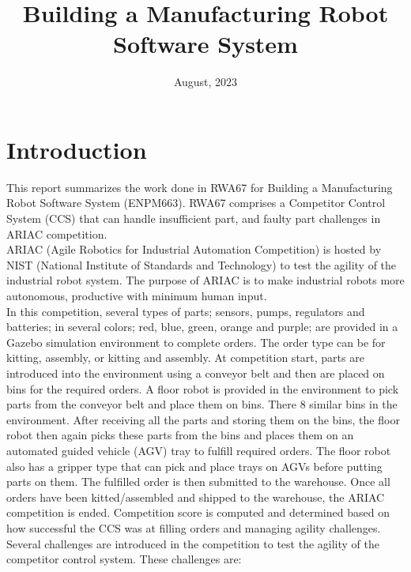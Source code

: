 \documentclass{uva-inf-article}
\title{Building a Manufacturing
Robot Software System}
\date{August, 2023}
\begin{document}
\maketitle 
\newpage
\tableofcontents
\newpage
\listoffigures
\newpage
\setlength{\hsize}{0.9\hsize}
\justifying
\section{Introduction}
This report summarizes the work done in RWA67 for Building a Manufacturing Robot Software
System (ENPM663). RWA67 comprises a Competitor Control System (CCS) that can handle insufficient part, and faulty part challenges in ARIAC competition.\\

\noindent ARIAC (Agile Robotics for Industrial Automation Competition) is hosted by NIST (National Institute of Standards and Technology) to test the agility of the industrial robot system. The purpose of ARIAC is to make industrial robots more autonomous, productive with minimum human input.\\

\noindent In this competition, several types of parts; sensors, pumps, regulators and batteries; in several colors; red, blue, green, orange and purple; are provided in a Gazebo simulation environment to complete orders. The order type can be for kitting, assembly, or kitting and assembly. At competition start, parts are introduced into the environment using a conveyor belt and then are placed on bins for the required orders. A floor robot is provided in the environment to pick parts from the conveyor belt and place them on bins. There 8 similar bins in the environment. After receiving all the parts and storing them on the bins, the floor robot then again picks these parts from the bins and places them on an automated guided vehicle (AGV) tray to fulfill required orders. The floor robot also has a gripper type that can pick and place trays on AGVs before putting parts on them. The fulfilled order is then submitted to the warehouse.  Once all orders have been kitted/assembled and shipped to the warehouse, the ARIAC competition is ended.  Competition score is computed and determined based on how successful the CCS was at filling orders and managing agility challenges.\\

\noindent Several challenges are introduced in the competition to test the agility of the competitor control system. These challenges are:\\
\end{document}
